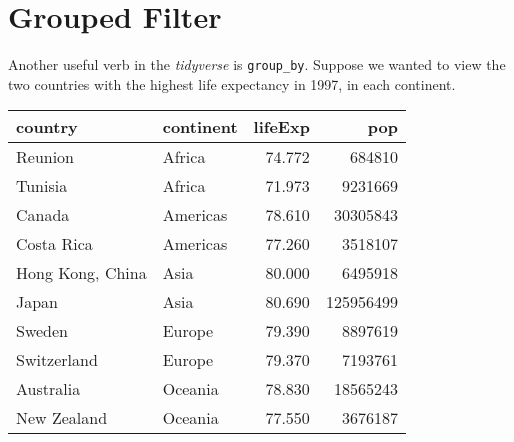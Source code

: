 \documentclass[
]{book}
\newenvironment{Shaded}{\begin{snugshade}}{\end{snugshade}}
\newcommand{\DataTypeTok}[1]{\textcolor[rgb]{0.13,0.29,0.53}{#1}}
\newcommand{\DecValTok}[1]{\textcolor[rgb]{0.00,0.00,0.81}{#1}}
\newcommand{\KeywordTok}[1]{\textcolor[rgb]{0.13,0.29,0.53}{\textbf{#1}}}
\newcommand{\NormalTok}[1]{#1}
\newcommand{\OperatorTok}[1]{\textcolor[rgb]{0.81,0.36,0.00}{\textbf{#1}}}
\newcommand{\StringTok}[1]{\textcolor[rgb]{0.31,0.60,0.02}{#1}}
\begin{document}
\hypertarget{grouped-filter}{%
\section{Grouped Filter}\label{grouped-filter}}

Another useful verb in the \emph{tidyverse} is \texttt{group\_by}. Suppose we wanted to view the two countries with the highest life expectancy in 1997, in each continent.

\begin{Shaded}
\end{Shaded}

\begin{tabular}{l|l|r|r}
\hline
country & continent & lifeExp & pop\\
\hline
Reunion & Africa & 74.772 & 684810\\
\hline
Tunisia & Africa & 71.973 & 9231669\\
\hline
Canada & Americas & 78.610 & 30305843\\
\hline
Costa Rica & Americas & 77.260 & 3518107\\
\hline
Hong Kong, China & Asia & 80.000 & 6495918\\
\hline
Japan & Asia & 80.690 & 125956499\\
\hline
Sweden & Europe & 79.390 & 8897619\\
\hline
Switzerland & Europe & 79.370 & 7193761\\
\hline
Australia & Oceania & 78.830 & 18565243\\
\hline
New Zealand & Oceania & 77.550 & 3676187\\
\hline
\end{tabular}
\end{document}
